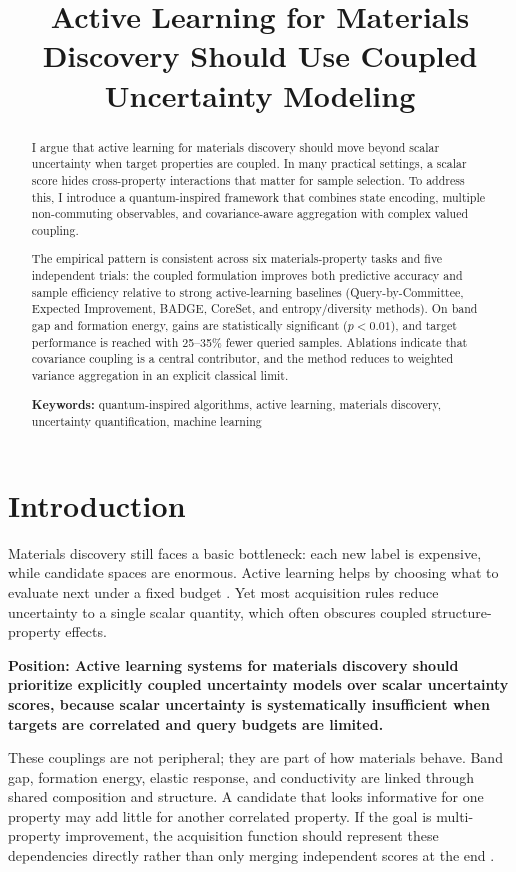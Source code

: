 \documentclass[conference]{IEEEtran}
\title{Active Learning for Materials Discovery Should Use Coupled Uncertainty Modeling}
\author{
\IEEEauthorblockN{Arnav Kapoor\orcidlink{0009-0007-9818-7908}}
\IEEEauthorblockA{
Indian Institute of Science Education and Research Bhopal, India\\
arnavkapoor23@iiserb.ac.in
}
}
\begin{document}
\maketitle
\thispagestyle{IEEEtitlepagestyle}

\begin{abstract}
I argue that active learning for materials discovery should move beyond scalar uncertainty when target properties are coupled. In many practical settings, a scalar score hides cross-property interactions that matter for sample selection. To address this, I introduce a quantum-inspired framework that combines state encoding, multiple non-commuting observables, and covariance-aware aggregation with complex valued coupling.

The empirical pattern is consistent across six materials-property tasks and five independent trials: the coupled formulation improves both predictive accuracy and sample efficiency relative to strong active-learning baselines (Query-by-Committee, Expected Improvement, BADGE, CoreSet, and entropy/diversity methods). On band gap and formation energy, gains are statistically significant ($p<0.01$), and target performance is reached with 25--35\% fewer queried samples. Ablations indicate that covariance coupling is a central contributor, and the method reduces to weighted variance aggregation in an explicit classical limit.

\textbf{Keywords:} quantum-inspired algorithms, active learning, materials discovery, uncertainty quantification, machine learning
\end{abstract}
\section{Introduction}

Materials discovery still faces a basic bottleneck: each new label is expensive, while candidate spaces are enormous. Active learning helps by choosing what to evaluate next under a fixed budget \cite{wang2023active, huang2024machine}. Yet most acquisition rules reduce uncertainty to a single scalar quantity, which often obscures coupled structure-property effects.

\textbf{Position: Active learning systems for materials discovery should prioritize explicitly coupled uncertainty models over scalar uncertainty scores, because scalar uncertainty is systematically insufficient when targets are correlated and query budgets are limited.}

These couplings are not peripheral; they are part of how materials behave. Band gap, formation energy, elastic response, and conductivity are linked through shared composition and structure. A candidate that looks informative for one property may add little for another correlated property. If the goal is multi-property improvement, the acquisition function should represent these dependencies directly rather than only merging independent scores at the end \cite{wang2023active, ren2022accelerating}.
\end{document}

